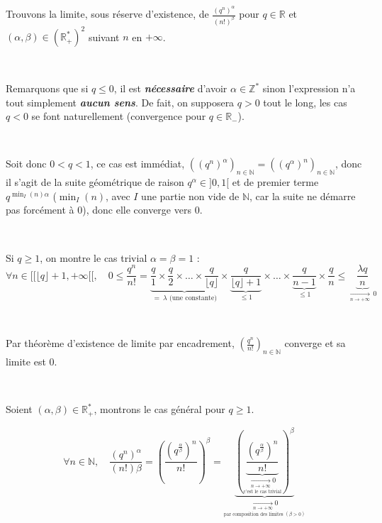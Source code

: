 \documentclass{article}
\begin{document}
\



\

Trouvons la limite, sous réserve d'existence, de $\frac{\left(q^n \right)^\alpha}{(n!)^\beta}$ pour $q\in \mathbb{R}$ et $(\alpha,\beta)\in \left( \mathbb{R}_+^* \right)^2$ suivant $n$ en $+\infty$.

\

Remarquons que si $q\leq0$, il est \textbf{\textit{nécessaire}} d'avoir $\alpha\in\mathbb{Z}^*$ sinon l'expression n'a tout simplement \textbf{\textit{aucun sens}}. De fait, on supposera $q>0$ tout le long, les cas $q<0$ se font naturellement (convergence pour $q\in \mathbb{R_-}$).

\

Soit donc $0<q<1$, ce cas est immédiat, $\left( \left(q^n \right)^\alpha\right)_{n\in\mathbb{N}}=\left( \left(q^\alpha \right)^n\right)_{n\in\mathbb{N}}$, donc il s'agit de la suite géométrique de raison $q^\alpha \in ]0,1[$ et de premier terme $q^{\min_{I}(n)\alpha}$ ($\min_{I}(n)$, avec $I$ une partie non vide de $\mathbb{N}$, car la suite ne démarre pas forcément à $0$), donc elle converge vers $0$.

\

Si $q\geq 1$, on montre le cas trivial $\alpha = \beta =1$ : 
\[
\forall n\in [\![ \lfloor q \rfloor +1,+\infty [\![, \quad 0 \leq \frac{q^n}{n!} = \underset{=\ \lambda \text{ (une constante)}}{\underbrace{\frac{q}{1} \times \frac{q}{2} \times \dots \times \frac{q}{\lfloor q \rfloor} }}\times \underset{\leq 1}{\underbrace{\frac{q}{\lfloor q\rfloor +1}}} \times \dots \times \underset{\leq1}{\underbrace{\frac{q}{n-1}}} \times \frac{q}{n} \leq \underset{\xrightarrow[n\to +\infty]{} \ 0}{\underbrace{\frac{\lambda q}{n}}}
\]

\

Par théorème d'existence de limite par encadrement, $\left( \frac{q^n}{n!} \right)_{n\in \mathbb{N}}$ converge et sa limite est $0$.

\

Soient $(\alpha,\beta)\in \mathbb{R}^*_+$, montrons le cas général pour $q\geq 1$.

\[
\forall n \in \mathbb{N}, \quad \frac{(q^n)^\alpha}{(n!)\beta} = \left( \frac{\left(q^{\frac{\alpha}{\beta}}\right)^n}{n!} \right)^\beta = \underset{\underset{\text{par composition des limites }(\beta>0)}{\xrightarrow[n\to +\infty]{} 0}}{\underbrace{\left( \underset{\underset{\text{c'est le cas trivial}}{\xrightarrow[n\to +\infty]{} 0}}{\underbrace{\frac{\left(q^{\frac{\alpha}{\beta}}\right)^n}{n!}}} \right)^\beta}}
\]
\end{document}

